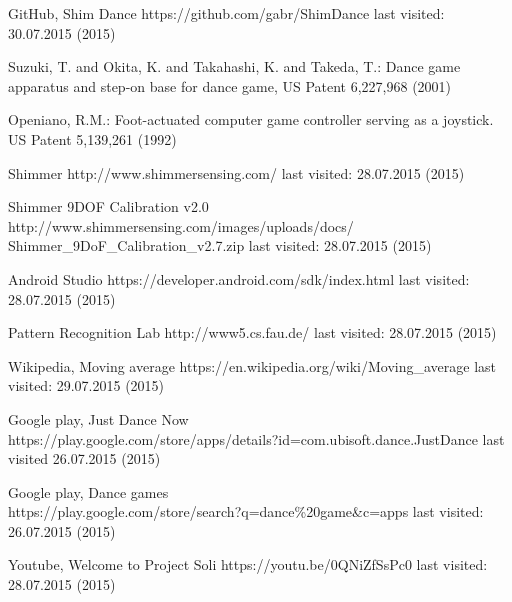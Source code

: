 \documentclass[conference]{IEEEtran}
\begin{document}
\begin{thebibliography}{5}

GitHub, Shim Dance {https://github.com/gabr/ShimDance} last visited: 30.07.2015 (2015)

Suzuki, T. and Okita, K. and Takahashi, K. and Takeda, T.: {Dance game apparatus and step-on base for dance game}, US Patent 6,227,968 (2001)

Openiano, R.M.: {Foot-actuated computer game controller serving as a joystick}. US Patent 5,139,261 (1992)

Shimmer {http://www.shimmersensing.com/} last visited: 28.07.2015 (2015)

Shimmer 9DOF Calibration v2.0\\{http://www.shimmersensing.com/images/uploads/docs/\\Shimmer\_9DoF\_Calibration\_v2.7.zip} last visited: 28.07.2015 (2015)

Android Studio {https://developer.android.com/sdk/index.html} last visited: 28.07.2015 (2015)

Pattern Recognition Lab {http://www5.cs.fau.de/} last visited: 28.07.2015 (2015)

Wikipedia, Moving average {https://en.wikipedia.org/wiki/Moving\_average} last visited: 29.07.2015 (2015)

Google play, Just Dance Now\\{https://play.google.com/store/apps/details?id=com.ubisoft.dance.JustDance} last visited 26.07.2015 (2015)

Google play, Dance games\\{https://play.google.com/store/search?q=dance\%20game\&c=apps} last visited: 26.07.2015 (2015)

Youtube, Welcome to Project Soli {https://youtu.be/0QNiZfSsPc0} last visited: 28.07.2015 (2015)

\end{thebibliography}

\end{document}
